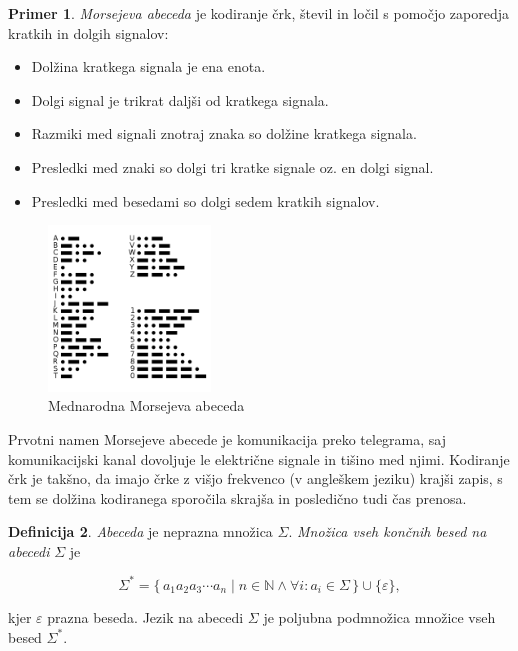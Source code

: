 \documentclass{amsart}
\newcommand{\N}{\mathbb{N}}
\theoremstyle{definition} %
\newtheorem{definicija}{Definicija}[section]
\newtheorem{primer}[definicija]{Primer}
\theoremstyle{plain} %
\begin{document}
\begin{primer}

    \textit{Morsejeva abeceda} je kodiranje črk, števil in ločil s pomočjo zaporedja kratkih
    in dolgih signalov:

    \begin{itemize}
        \item Dolžina kratkega signala je ena enota.
        \item Dolgi signal je trikrat daljši od kratkega signala.
        \item Razmiki med signali znotraj znaka so dolžine kratkega signala.
        \item Presledki med znaki so dolgi tri kratke signale oz. en dolgi signal.
        \item Presledki med besedami so dolgi sedem kratkih signalov.
    \end{itemize}

    \begin{figure}[h]
        \centering
        \includegraphics[width=4.3cm]{International_Morse_Code.svg.png}
        \caption{Mednarodna Morsejeva abeceda}
    \end{figure}

    Prvotni namen Morsejeve abecede je komunikacija preko telegrama, saj komunikacijski
    kanal dovoljuje le električne signale in tišino med njimi. Kodiranje črk je takšno,
    da imajo črke z višjo frekvenco (v angleškem jeziku) krajši zapis, s tem se dolžina
     kodiranega sporočila skrajša in posledično tudi čas prenosa.

\end{primer}

\begin{definicija}

    \textit{Abeceda} je neprazna množica $ \Sigma $. \textit{Množica vseh končnih besed na 
    abecedi} $ \Sigma $ je

    \begin{equation*}
        \Sigma^* = \{\, a_1 a_2 a_3 \cdots a_n \mid n \in \N \land \forall i: a_i \in \Sigma \,\} \cup \{ \varepsilon \}, 
    \end{equation*}

    kjer $ \varepsilon $ prazna beseda. Jezik na abecedi $ \Sigma $ je poljubna podmnožica množice vseh 
    besed $ \Sigma^* $.

\end{definicija}
\end{document}

